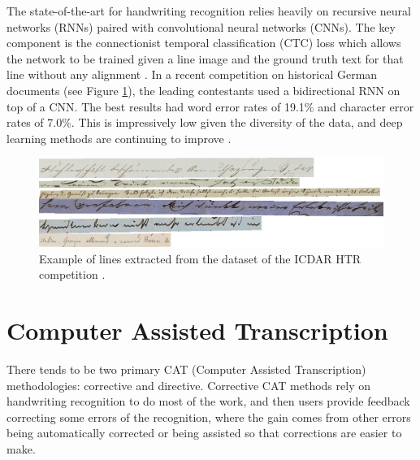 \documentclass[ms,electronic,twosidetoc,letterpaper,chaptercenter,parttop,lof,lot]{byumsphd}
\begin{document}
The state-of-the-art for handwriting recognition relies heavily on recursive neural networks (RNNs) paired with convolutional neural networks (CNNs). The key component is the connectionist temporal classification (CTC) loss which allows the network to be trained given a line image and the ground truth text for that line without any alignment \cite{CTC}. In a recent competition on historical German documents \cite{icdarComp2017} (see Figure \ref{fig:germanlines}), the leading contestants used a bidirectional RNN on top of a CNN. The best results had word error rates of 19.1\% and character error rates of 7.0\%. This is impressively low given the diversity of the data, and deep learning methods are continuing to improve \cite{wigington2017,puigcerver2017}.

\begin{figure}[t]
    \centering
    \includegraphics[width=.98\textwidth]{german_lines}
    \caption{Example of lines extracted from the dataset of the ICDAR HTR competition \cite{icdarComp2017}.}
    \label{fig:germanlines}
\end{figure}


\section{Computer Assisted Transcription} %

There tends to be two primary CAT (Computer Assisted Transcription) methodologies: corrective and directive. Corrective CAT methods rely on handwriting recognition to do most of the work, and then users provide feedback correcting some errors of the recognition, where the gain comes from other errors being automatically corrected or being assisted so that corrections are easier to make.
\end{document}
